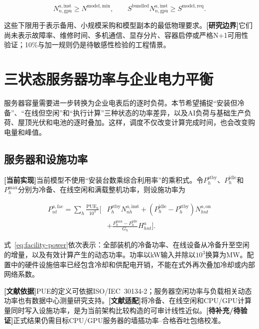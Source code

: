 \documentclass[preprint]{elsarticle}
\newcommand{\implemented}{\textcolor{green!40!black}{\textbf{[当前实现]}}}
\newcommand{\literature}{\textcolor{blue!70!black}{\textbf{[文献依据]}}}
\newcommand{\adapted}{\textcolor{violet!75!black}{\textbf{[文献适配]}}}
\newcommand{\pending}{\textcolor{red!70!black}{\textbf{[待补充/待验证]}}}
\newcommand{\boundary}{\textcolor{black!65}{\textbf{[研究边界]}}}
\begin{document}
\begin{equation}
 N^{a,\mathrm{inst}}_{n,\mathrm{gpu}}\geq N^{\mathrm{model,min}},\qquad
 S^{\mathrm{bundled}}N^{a,\mathrm{inst}}_{n,\mathrm{gpu}}
 \geq S^{\mathrm{model,req}}.
 \label{eq:model-state}
\end{equation}

这些下限用于表示备用、小规模采购和模型副本的最低物理要求。\boundary 它们尚未表示故障率、维修时间、多机通信、显存分片、容器启停或严格N+1可用性验证；10\%与加一规则仍是待敏感性检验的工程情景。

\section{三状态服务器功率与企业电力平衡}

服务器容量需要进一步转换为企业电表后的逐时负荷。本节希望捕捉“安装但冷备”、“在线但空闲”和“执行计算”三种状态的功率差异，以及AI负荷与基础生产负荷、屋顶光伏和电池的逐时叠加。这样，调度不仅改变计算完成时间，也会改变购电量和峰值。

\subsection{服务器和设施功率}

\implemented 当前模型不使用“安装台数乘综合利用率”的乘积式。令$P_h^{\mathrm{stby}}$、$P_h^{\mathrm{idle}}$和$P_h^{\max}$分别为冷备、在线空闲和满载整机功率，则设施功率为

\begin{equation}
\begin{aligned}
 P^{a,\mathrm{fac}}_{nt}=\sum_h\frac{\mathrm{PUE}_h}{10^3}\bigg[&
 P_h^{\mathrm{stby}}N^{a,\mathrm{inst}}_{nh}
 +(P_h^{\mathrm{idle}}-P_h^{\mathrm{stby}})N^{a,\mathrm{on}}_{hnt}\\
 &+\frac{P_h^{\max}-P_h^{\mathrm{idle}}}{G_h}H^a_{hnt}\bigg].
\end{aligned}
 \label{eq:facility-power}
\end{equation}

式~\eqref{eq:facility-power}依次表示：全部装机的冷备功率、在线设备从冷备升至空闲的增量，以及有效计算产生的动态功率。功率以kW输入并除以$10^3$换算为MW。配置中的硬件设施倍率已经包含冷却和供配电开销，不能在式外再次叠加冷却或内部网络系数。

\literature PUE的定义可依据ISO/IEC~30134-2；服务器空闲功率与负载相关动态功率也有数据中心测量研究支持。\adapted 将冷备、在线空闲和CPU/GPU计算量同时写入设施功率，是为当前架构比较构造的可审计线性近似。\pending 正式结果仍需目标CPU/GPU服务器的墙插功率--合格吞吐包络校准。
\end{document}
